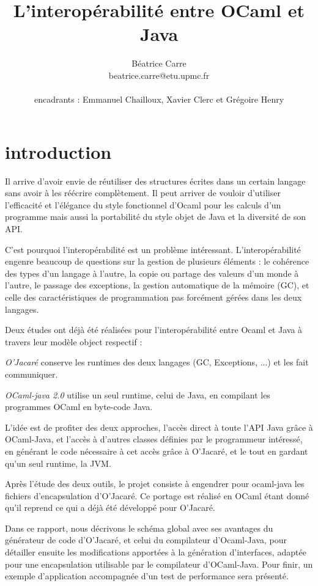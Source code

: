 \documentclass[a4paper, 11pt, notitlepage]{article}
\title{
  \huge L'interopérabilité entre OCaml et Java\\
}
\author{
  Béatrice Carre \\
  beatrice.carre@etu.upmc.fr \\
  \\
  encadrants : Emmanuel Chailloux, Xavier Clerc et Grégoire Henry \\
}
\begin{document}
\maketitle
\tableofcontents
\newpage
\section*{introduction}
Il arrive d'avoir envie de réutiliser des structures
écrites dans un certain langage sans avoir à les réécrire complètement.
Il peut arriver de vouloir d'utiliser l'efficacité et
l'élégance du style fonctionnel d'Ocaml pour les calculs d'un
programme mais aussi la portabilité du style objet de Java et la
diversité de son API.

C'est pourquoi l'interopérabilité est un problème intéressant.
L'interopérabilité engenre beaucoup de questions sur la gestion de
plusieurs éléments :
le cohérence des types d'un langage à l'autre,
la copie ou partage des valeurs d'un monde à l'autre,
le passage des exceptions,
la gestion automatique de la mémoire (GC), 
et celle des caractéristiques de programmation pas forcément gérées dans les
deux langages.

Deux études ont déjà été réalisées pour l’interopérabilité entre
Ocaml et Java à travers leur modèle object respectif :

\emph{O’Jacaré} conserve les runtimes des deux langages (GC,
Exceptions, ...) et les fait communiquer.

\emph{OCaml-java
  2.0} utilise un seul runtime, celui de Java, en compilant les programmes OCaml en byte-code Java.
\newline

L'idée est de profiter des deux approches, l'accès direct à toute
l'API Java grâce à OCaml-Java, et l'accès à d'autres classes définies
par le programmeur intéressé, en générant le code nécessaire à cet
accès grâce à O'Jacaré, et le tout en gardant qu'un seul runtime, la JVM.

Après l’étude des deux outils, le projet consiste à engendrer pour
ocaml-java les fichiers d’encapsulation d'O’Jacaré. Ce
portage est réalisé en OCaml étant donné qu'il reprend ce qui
a déjà été développé pour O’Jacaré.
\newline

Dans ce rapport, nous décrivons le schéma global avec ses avantages du
générateur de code d'O'Jacaré, et celui du compilateur d'Ocaml-Java,
pour détailler ensuite les modifications apportées à la génération
d'interfaces, adaptée pour une encapsulation utilisable par le
compilateur d'OCaml-Java. 
Pour finir, un exemple d'application accompagnée d'un
test de performance sera présenté.
\end{document}
